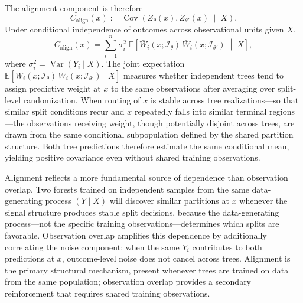 \documentclass[11pt]{article}
\theoremstyle{plain}
\theoremstyle{definition}
\theoremstyle{remark}
\DeclareMathOperator{\Var}{Var}
\DeclareMathOperator{\Cov}{Cov}
\begin{document}
The alignment component is therefore
\[
C_{\mathrm{align}}(x)
:=
\Cov\!\left(
Z_\theta(x), Z_{\theta'}(x)
\;\middle|\;
X
\right).
\]
Under conditional independence of outcomes across observational units given $X$,
\begin{equation}
	\label{eq:calign_explicit}
	C_{\mathrm{align}}(x)
	=
	\sum_{i=1}^n
	\sigma_i^2\;
	\mathbb E\!\left[
	\bar W_i(x;\mathcal I_\theta)\,
	\bar W_i(x;\mathcal I_{\theta'})
	\;\middle|\;
	X
	\right],
\end{equation}
where $\sigma_i^2=\Var(Y_i\mid X)$. The joint expectation $\mathbb E[\bar W_i(x;\mathcal I_\theta)\,\bar W_i(x;\mathcal I_{\theta'})\mid X]$ measures whether independent trees tend to assign predictive weight at $x$ to the same observations after averaging over split-level randomization. When routing of $x$ is stable across tree realizations---so that similar split conditions recur and $x$ repeatedly falls into similar terminal regions---the observations receiving weight, though potentially disjoint across trees, are drawn from the same conditional subpopulation defined by the shared partition structure. Both tree predictions therefore estimate the same conditional mean, yielding positive covariance even without shared training observations.

Alignment reflects a more fundamental source of dependence than observation overlap. Two forests trained on independent samples from the same data-generating process $(Y\mid X)$ will discover similar partitions at $x$ whenever the signal structure produces stable split decisions, because the data-generating process---not the specific training observations---determines which splits are favorable. Observation overlap amplifies this dependence by additionally correlating the noise component: when the same $Y_i$ contributes to both predictions at $x$, outcome-level noise does not cancel across trees. Alignment is the primary structural mechanism, present whenever trees are trained on data from the same population; observation overlap provides a secondary reinforcement that requires shared training observations.
\end{document}
